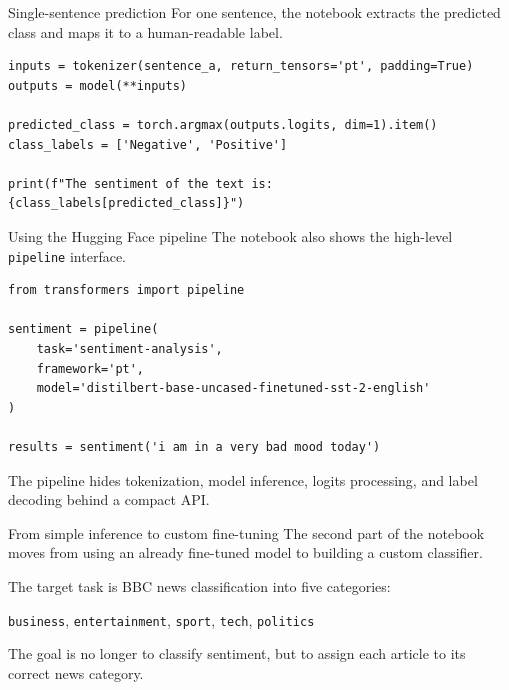 \documentclass[aspectratio=169]{beamer}
\begin{document}
\begin{frame}[fragile]{Single-sentence prediction}
For one sentence, the notebook extracts the predicted class and maps it to a human-readable label.

\begin{lstlisting}[style=pythonstyle]
inputs = tokenizer(sentence_a, return_tensors='pt', padding=True)
outputs = model(**inputs)

predicted_class = torch.argmax(outputs.logits, dim=1).item()
class_labels = ['Negative', 'Positive']

print(f"The sentiment of the text is: {class_labels[predicted_class]}")
\end{lstlisting}
\end{frame}

\begin{frame}[fragile]{Using the Hugging Face pipeline}
The notebook also shows the high-level \texttt{pipeline} interface.

\begin{lstlisting}[style=pythonstyle]
from transformers import pipeline

sentiment = pipeline(
    task='sentiment-analysis',
    framework='pt',
    model='distilbert-base-uncased-finetuned-sst-2-english'
)

results = sentiment('i am in a very bad mood today')
\end{lstlisting}

\vspace{0.2cm}

The pipeline hides tokenization, model inference, logits processing, and label decoding behind a compact API.
\end{frame}

\begin{frame}{From simple inference to custom fine-tuning}
The second part of the notebook moves from using an already fine-tuned model to building a custom classifier.

\vspace{0.3cm}

The target task is BBC news classification into five categories:
\begin{center}
\texttt{business}, \texttt{entertainment}, \texttt{sport}, \texttt{tech}, \texttt{politics}
\end{center}

\vspace{0.3cm}

The goal is no longer to classify sentiment, but to assign each article to its correct news category.
\end{frame}
\end{document}
